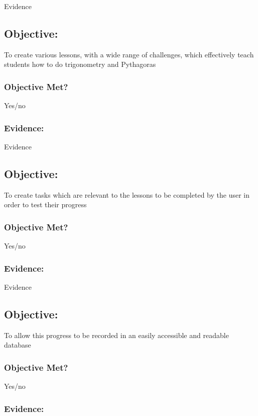 Evidence

\subsection{Objective: }

To create various lessons, with a wide range of challenges, which effectively teach students how to do trigonometry and Pythagoras

\subsubsection{Objective Met?}

Yes/no 

\subsubsection{Evidence: }

Evidence

\subsection{Objective: }

To create tasks which are relevant to the lessons to be completed by the user in order to test their progress

\subsubsection{Objective Met?}

Yes/no 

\subsubsection{Evidence: }

Evidence

\subsection{Objective: }

To allow this progress to be recorded in an easily accessible and readable database

\subsubsection{Objective Met?}

Yes/no 

\subsubsection{Evidence: }

